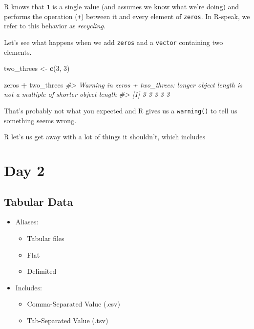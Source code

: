 \documentclass[
]{report}
\newenvironment{Shaded}{\begin{snugshade}}{\end{snugshade}}
\newcommand{\CommentTok}[1]{\textcolor[rgb]{0.56,0.35,0.01}{\textit{#1}}}
\newcommand{\DecValTok}[1]{\textcolor[rgb]{0.00,0.00,0.81}{#1}}
\newcommand{\KeywordTok}[1]{\textcolor[rgb]{0.13,0.29,0.53}{\textbf{#1}}}
\newcommand{\NormalTok}[1]{#1}
\newcommand{\OperatorTok}[1]{\textcolor[rgb]{0.81,0.36,0.00}{\textbf{#1}}}
\newcommand{\StringTok}[1]{\textcolor[rgb]{0.31,0.60,0.02}{#1}}
\providecommand{\tightlist}{%
  \setlength{\itemsep}{0pt}\setlength{\parskip}{0pt}}
\begin{document}
R knows that \texttt{1} is a single value (and assumes we know what we're doing) and performs the operation (\texttt{+}) between it and every element of \texttt{zeros}. In R-speak, we refer to this behavior as \emph{recycling}.

Let's see what happens when we add \texttt{zeros} and a \texttt{vector} containing two elements.

\begin{Shaded}
\begin{Highlighting}[]
\NormalTok{two\_threes \textless{}{-}}\StringTok{ }\KeywordTok{c}\NormalTok{(}\DecValTok{3}\NormalTok{, }\DecValTok{3}\NormalTok{)}

\NormalTok{zeros }\OperatorTok{+}\StringTok{ }\NormalTok{two\_threes}
\CommentTok{\#\textgreater{} Warning in zeros + two\_threes: longer object length is not a multiple of shorter object length}
\CommentTok{\#\textgreater{} [1] 3 3 3 3 3}
\end{Highlighting}
\end{Shaded}

That's probably not what you expected and R gives us a \texttt{warning()} to tell us something seems wrong.

R let's us get away with a lot of things it shouldn't, which includes

\cleardoublepage

\hypertarget{part-day-2}{%
\part{Day 2}\label{part-day-2}}

\hypertarget{tabular-data}{%
\chapter{Tabular Data}\label{tabular-data}}

\begin{itemize}
\tightlist
\item
  Aliases:

  \begin{itemize}
  \tightlist
  \item
    Tabular files
  \item
    Flat
  \item
    Delimited
  \end{itemize}
\item
  Includes:

  \begin{itemize}
  \tightlist
  \item
    Comma-Separated Value (.csv)
  \item
    Tab-Separated Value (.tsv)
  \end{itemize}
\end{itemize}
\end{document}
